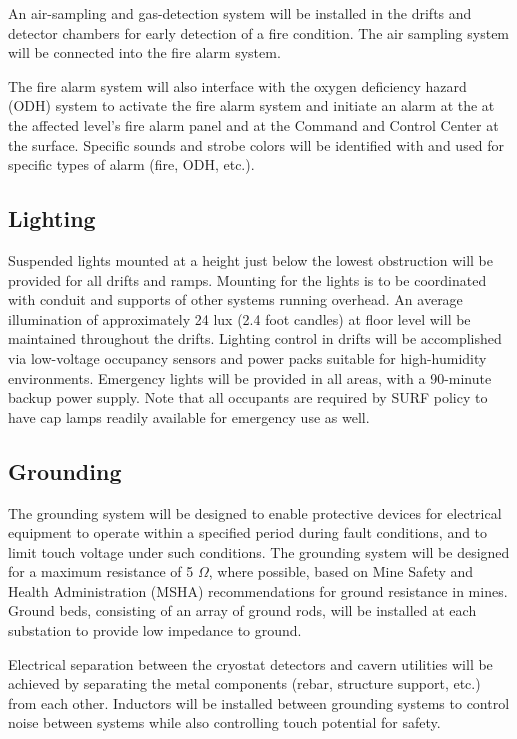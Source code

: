 An air-sampling and gas-detection system will be installed in the drifts and detector chambers for early detection of a fire condition. The air sampling system will be connected into the fire alarm system.

The fire alarm system will also interface with the oxygen deficiency hazard (ODH) system to activate the fire alarm system and initiate an alarm at the at the affected level’s fire alarm panel and at the Command and Control Center at the surface. Specific sounds and strobe colors will be identified with and
used for specific types of alarm (fire, ODH, etc.).

\subsection{Lighting}
\label{sec:fscf-und-light}

Suspended lights mounted at a height just below the lowest obstruction will be provided for all drifts and ramps. Mounting for the lights is to be coordinated with conduit and supports of other systems running overhead. An average illumination of approximately 24 lux (2.4 foot candles) at floor level will be maintained throughout the drifts. Lighting control in drifts will be accomplished via low-voltage occupancy sensors and power packs suitable for high-humidity environments.  Emergency lights will be provided in all areas, with a 90-minute backup power supply.  Note that all occupants are required by SURF policy to have cap lamps readily available for emergency use as well.


\subsection{Grounding}
\label{sec:fscf-und-grounding}

The grounding system will be designed to 
enable protective devices for electrical equipment to operate within a specified period during fault conditions, and to limit touch voltage under such conditions.  The grounding system will be designed for a maximum resistance of 5 $\Omega$, where possible, based on Mine Safety and Health Administration (MSHA) recommendations for ground resistance in mines.  Ground beds, consisting of an array of ground rods, will be installed at each substation to provide low impedance to ground.

Electrical separation between the cryostat detectors and cavern utilities will be achieved by separating the metal components (rebar, structure support, etc.) from each other. Inductors will be installed between grounding systems to control noise between systems while also controlling touch potential for safety.

